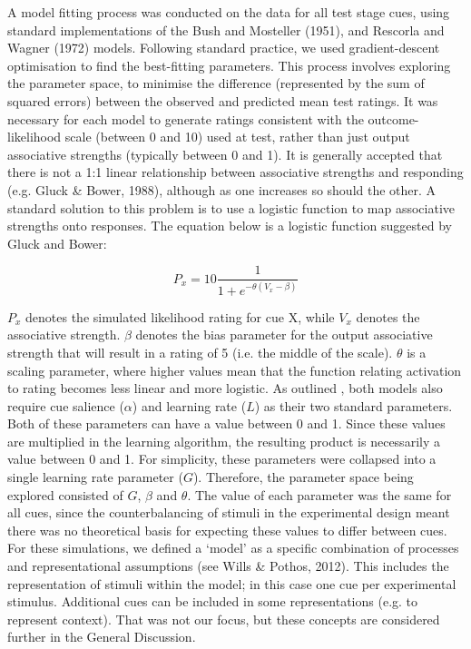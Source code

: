 \documentclass[twocolumn]{article}
\begin{document}
A model fitting process was conducted on the data for all test stage
cues, using standard implementations of the Bush and Mosteller (1951),
and Rescorla and Wagner (1972) models. Following standard practice, we
used gradient-descent optimisation to find the best-fitting parameters.
This process involves exploring the parameter space, to minimise the
difference (represented by the sum of squared errors) between the
observed and predicted mean test ratings. It was necessary for each
model to generate ratings consistent with the outcome-likelihood scale
(between 0 and 10) used at test, rather than just output associative
strengths (typically between 0 and 1). It is generally accepted that
there is not a 1:1 linear relationship between associative strengths and
responding (e.g. Gluck \& Bower, 1988), although as one increases so
should the other. A standard solution to this problem is to use a
logistic function to map associative strengths onto responses. The
equation below is a logistic function suggested by Gluck and Bower:

\begin{equation}
  P_x = 10 \frac{1}{1 + e^{-\theta(V_x - \beta)}}
\end{equation}

$P_x$ denotes the simulated likelihood rating for cue X,
while $V_x$ denotes the associative strength. $\beta$ denotes the
bias parameter for the output associative strength that will result in a
rating of 5 (i.e. the middle of the scale). $\theta$ is a scaling parameter,
where higher values mean that the function relating activation to rating
becomes less linear and more logistic. As outlined , both models also
require cue salience ($\alpha$) and learning rate ($L$) as their two
standard parameters. Both of these parameters can have a value between 0
and 1. Since these values are multiplied in the learning algorithm, the
resulting product is necessarily a value between 0 and 1. For
simplicity, these parameters were collapsed into a single learning rate
parameter ($G$). Therefore, the parameter space being explored
consisted of $G$, $\beta$ and $\theta$. The value of each parameter was the same
for all cues, since the counterbalancing of stimuli in the experimental
design meant there was no theoretical basis for expecting these values
to differ between cues. For these simulations, we defined a `model' as a
specific combination of processes and representational assumptions (see
Wills \& Pothos, 2012). This includes the representation of stimuli
within the model; in this case one cue per experimental stimulus.
Additional cues can be included in some representations (e.g. to
represent context). That was not our focus, but these concepts are
considered further in the General Discussion.
\end{document}
